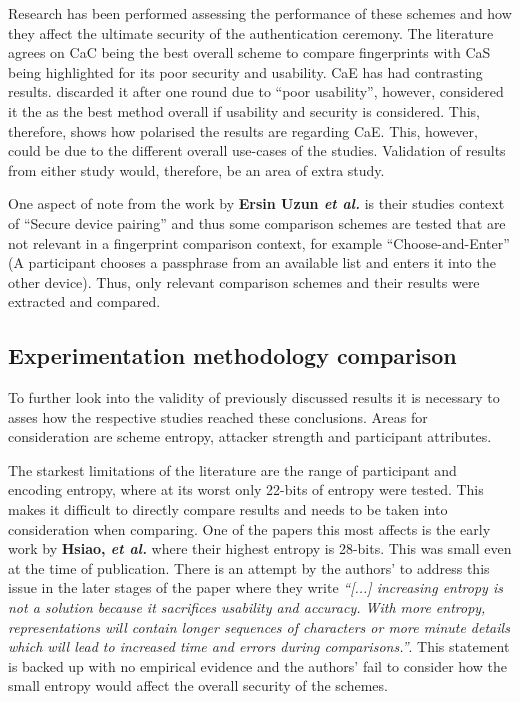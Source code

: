 Research has been performed assessing the performance of these schemes and how they affect the ultimate security of the authentication ceremony. The literature agrees on CaC being the best overall scheme to compare fingerprints \cite{tan2017can}\cite{uzun2007usability} with CaS being highlighted for its poor security and usability. CaE has  had contrasting results. \cite{uzun2007usability} discarded it after one round due to ``poor usability'', however, \cite{tan2017can} considered it the as the best method overall if usability and security is considered. This, therefore, shows how polarised the results are regarding CaE. This, however, could be due to the different overall use-cases of the studies. Validation of results from either study would, therefore, be an area of extra study.

One aspect of note from the work by \textbf{Ersin Uzun \textit{et al.}}\cite{uzun2007usability} is their studies context  of  “Secure  device  pairing”  and  thus  some comparison schemes are tested that are not relevant in a fingerprint comparison context, for example “Choose-and-Enter” (A participant chooses a passphrase from an available list and enters it into the other device).  Thus, only relevant comparison schemes and their results were extracted and compared. \\

\subsection*{Experimentation methodology comparison}
To further look into the validity of previously discussed results it is necessary to asses how the respective studies reached these conclusions. Areas for consideration are scheme entropy, attacker strength and participant attributes.

The starkest limitations of the literature are the range of participant and encoding entropy, where at its worst only 22-bits of entropy were tested. This makes it difficult to directly compare results and needs to be taken into consideration when comparing. One of the papers this most affects is the early work by \textbf{Hsiao, \textit{et al.}}\cite{hsiao2009study}  where their highest entropy is 28-bits. This was small even at the time of publication. There is an attempt by the authors' to address this issue in the later stages of the paper where they write \textit{``[...] increasing entropy is not a solution because it sacrifices usability and accuracy. With more entropy, representations will contain longer sequences of characters or more minute details which will lead to increased time and errors during comparisons.''}. This statement is backed up with no empirical evidence and the authors' fail to consider how the small entropy would affect the overall security of the schemes.

